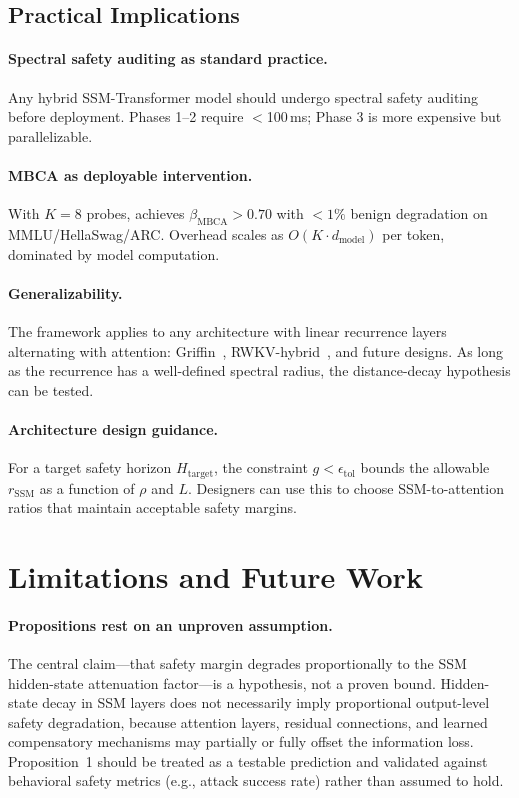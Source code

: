 \documentclass{article}
\newcommand{\rSSM}{r_{\mathrm{SSM}}}
\newcommand{\MBCA}{\mathrm{MBCA}}
\newcommand{\betaMBCA}{\beta_{\MBCA}}
\begin{document}
\subsection{Practical Implications}

\paragraph{Spectral safety auditing as standard practice.}
Any hybrid SSM-Transformer model should undergo spectral safety auditing before deployment. Phases 1--2 require $<$100\,ms; Phase 3 is more expensive but parallelizable.

\paragraph{MBCA as deployable intervention.}
With $K = 8$ probes, \MBCA{} achieves $\betaMBCA > 0.70$ with $< 1\%$ benign degradation on MMLU/HellaSwag/ARC. Overhead scales as $O(K \cdot d_{\mathrm{model}})$ per token, dominated by model computation.

\paragraph{Generalizability.}
The framework applies to any architecture with linear recurrence layers alternating with attention: Griffin~\cite{de2024griffin}, RWKV-hybrid~\cite{peng2023rwkv}, and future designs. As long as the recurrence has a well-defined spectral radius, the distance-decay hypothesis can be tested.

\paragraph{Architecture design guidance.}
For a target safety horizon $H_{\mathrm{target}}$, the constraint $g < \epsilon_{\mathrm{tol}}$ bounds the allowable $\rSSM$ as a function of $\rho$ and $L$. Designers can use this to choose SSM-to-attention ratios that maintain acceptable safety margins.

\section{Limitations and Future Work}
\label{sec:limitations}

\paragraph{Propositions rest on an unproven assumption.}
The central claim---that safety margin degrades proportionally to the SSM hidden-state attenuation factor---is a hypothesis, not a proven bound. Hidden-state decay in SSM layers does not necessarily imply proportional output-level safety degradation, because attention layers, residual connections, and learned compensatory mechanisms may partially or fully offset the information loss. Proposition~1 should be treated as a testable prediction and validated against behavioral safety metrics (e.g., attack success rate) rather than assumed to hold.
\end{document}
